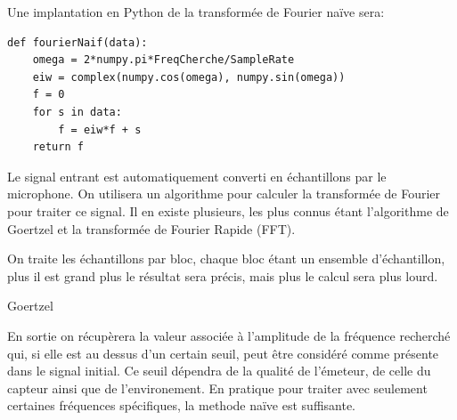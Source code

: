 \documentclass[12pt]{article}
\begin{document}
Une implantation en Python de la transformée de Fourier naïve sera:
\begin{verbatim}
def fourierNaif(data):
    omega = 2*numpy.pi*FreqCherche/SampleRate
    eiw = complex(numpy.cos(omega), numpy.sin(omega))
    f = 0
    for s in data:
        f = eiw*f + s
    return f
\end{verbatim}

Le signal entrant est automatiquement converti en échantillons par le microphone. On utilisera un algorithme pour calculer la transformée de Fourier pour traiter ce signal. Il en existe plusieurs, les plus connus étant l'algorithme de Goertzel et la transformée de Fourier Rapide (FFT).

On traite les échantillons par bloc, chaque bloc étant un ensemble d'échantillon, plus il est grand plus le résultat sera précis, mais plus le calcul sera plus lourd.
\begin{algorithm}[H]
\caption{Goertzel}
\begin{algorithmic}
\ENDFOR
{}
\end{algorithmic}
\end{algorithm}

En sortie on récupèrera la valeur associée à l'amplitude de la fréquence recherché qui, si elle est au dessus d'un certain seuil, peut être considéré comme présente dans le signal initial. Ce seuil dépendra de la qualité de l'émeteur, de celle du capteur ainsi que de l'environement.
En pratique pour traiter avec seulement certaines fréquences spécifiques, la methode naïve est suffisante.
\end{document}
